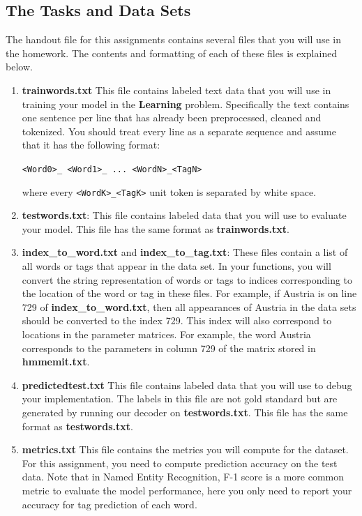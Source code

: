 \documentclass{article}
\begin{document}
\subsection{The Tasks and Data Sets}\label{dataset}
The handout file for this assignments contains several files that you will use in the homework. The contents and formatting of each of these files is explained below.
\begin{enumerate}

\item \textbf{trainwords.txt} This file contains labeled text data that you will use in training your model in the \textbf{Learning} problem. Specifically the text contains one sentence per line that has already been preprocessed, cleaned and tokenized. You should treat every line as a separate sequence and assume that it has the following format:

    \texttt{<Word0>\_<Tag0> <Word1>\_<Tag1> ... <WordN>\_<TagN>}

where every \texttt{<WordK>\_<TagK>} unit token is separated by white space.

\item \textbf{testwords.txt}: This file contains labeled data that you will use to evaluate your model. This file has the same format as \textbf{trainwords.txt}.
    
\item \textbf{index\_to\_word.txt} and \textbf{index\_to\_tag.txt}: These files contain a list of all words or tags that appear in the data set. In your functions, you will convert the string representation of words or tags to indices corresponding to the location of the word or tag in these files. For example, if Austria is on line 729 of \textbf{index\_to\_word.txt}, then all appearances of Austria in the data sets should be converted to the index 729. This index will also correspond to locations in the parameter matrices. For example, the word Austria corresponds to the parameters in column 729 of the matrix stored in \textbf{hmmemit.txt}.

\item \textbf{predictedtest.txt} This file contains labeled data that you will use to debug your implementation. The labels in this file are not gold standard but are generated by running our decoder on \textbf{testwords.txt}. This file has the same format as \textbf{testwords.txt}.

\item \textbf{metrics.txt} This file contains the metrics you will compute for the dataset. For this assignment, you need to compute prediction accuracy on the test data. Note that in Named Entity Recognition, F-1 score is a more common metric to evaluate the model performance, here you only need to report your accuracy for tag prediction of each word.


\end{enumerate}
\end{document}

